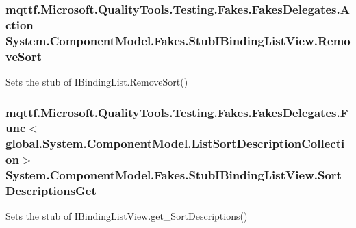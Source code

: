 \hypertarget{class_system_1_1_component_model_1_1_fakes_1_1_stub_i_binding_list_view_a1dfd832062d6b5c48afb4a58b2f05fe1}{
\subsubsection[{Remove\-Sort}]{\setlength{\rightskip}{0pt plus 5cm}mqttf.\-Microsoft.\-Quality\-Tools.\-Testing.\-Fakes.\-Fakes\-Delegates.\-Action System.\-Component\-Model.\-Fakes.\-Stub\-I\-Binding\-List\-View.\-Remove\-Sort}}\label{class_system_1_1_component_model_1_1_fakes_1_1_stub_i_binding_list_view_a1dfd832062d6b5c48afb4a58b2f05fe1}


Sets the stub of I\-Binding\-List.\-Remove\-Sort()

\hypertarget{class_system_1_1_component_model_1_1_fakes_1_1_stub_i_binding_list_view_add9f97f89fabd1397b75c1fe844fc740}{
\subsubsection[{Sort\-Descriptions\-Get}]{\setlength{\rightskip}{0pt plus 5cm}mqttf.\-Microsoft.\-Quality\-Tools.\-Testing.\-Fakes.\-Fakes\-Delegates.\-Func$<$global.\-System.\-Component\-Model.\-List\-Sort\-Description\-Collection$>$ System.\-Component\-Model.\-Fakes.\-Stub\-I\-Binding\-List\-View.\-Sort\-Descriptions\-Get}}\label{class_system_1_1_component_model_1_1_fakes_1_1_stub_i_binding_list_view_add9f97f89fabd1397b75c1fe844fc740}


Sets the stub of I\-Binding\-List\-View.\-get\-\_\-\-Sort\-Descriptions()

